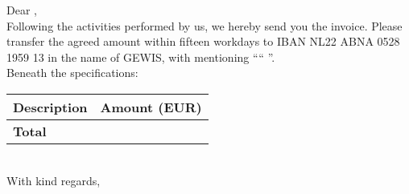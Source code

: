 \documentclass[
 digital,         %
 english         %
]{GEWISLetter}
\newcommand{\GEWIScontact}{%
\\%
}
\begin{document}
\GEWISfirstpage                 %
\printadresenkenmerk            %


Dear %
,\\[2\baselineskip]
Following the activities performed by us, we hereby send you the invoice. Please transfer the agreed amount within fifteen workdays to IBAN NL22 ABNA 0528 1959 13 in the name of GEWIS, with mentioning ````%
''.\\[\baselineskip]
Beneath the specifications:\\[\baselineskip]
\begin{tabularx}{\textwidth}{X r}\toprule
Description & Amount (EUR)\\\midrule
\cmidrule{2-2} \textbf{Total} & {\bfseries %
}\\\bottomrule
\end{tabularx}
\\[2\baselineskip]
With kind regards,\\[2\baselineskip]
\GEWIScontact
\end{document}
